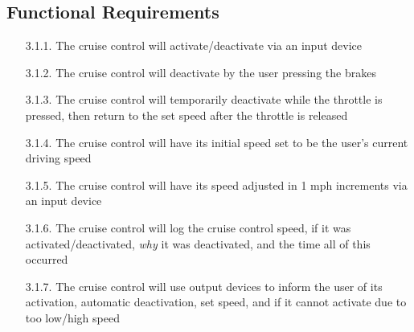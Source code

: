 \documentclass{article}
\begin{document}
	\subsection{Functional Requirements}
	\begin{enumerate}
		\item[3.1.1.] The cruise control will activate/deactivate via an input device
		\item[3.1.2.] The cruise control will deactivate by the user pressing the brakes
		\item[3.1.3.] The cruise control will temporarily deactivate while the throttle is pressed, then return to the set speed after the throttle is released
		\item[3.1.4.] The cruise control will have its initial speed set to be the user's current driving speed
		\item[3.1.5.] The cruise control will have its speed adjusted in 1 mph increments via an input device
		\item[3.1.6.] The cruise control will log the cruise control speed, if it was activated/deactivated, \textit{why} it was deactivated, and the time all of this occurred
		\item[3.1.7.] The cruise control will use output devices to inform the user of its activation, automatic deactivation, set speed, and if it cannot activate due to too low/high speed
	\end{enumerate}
	
\end{document}
